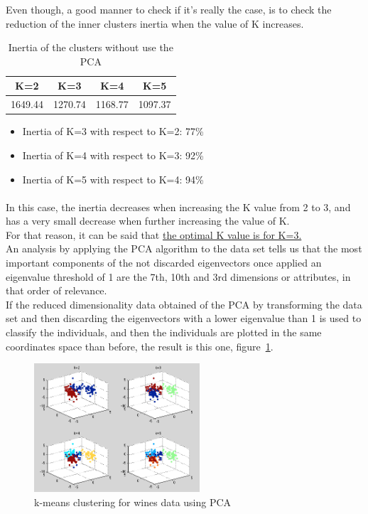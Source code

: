 \documentclass[12pt, a4paper]{article}
\begin{document}
Even though, a good manner to check if it's really the case, is to check the reduction of the inner clusters inertia when the value of K increases.
\begin{table}[ht!]
	\centering
	\begin{tabular}{|c|c|c|c|}
		\hline
		\rowcolor[gray]{0.85} \textbf{K=2}&\textbf{K=3}&\textbf{K=4}&\textbf{K=5}\\\hline
		1649.44&1270.74&1168.77&1097.37\\\hline
	\end{tabular}
	\label{tab:cars}
	\caption{Inertia of the clusters without use the PCA}
\end{table}
\begin{itemize}
	\item Inertia of K=3 with respect to K=2: 77\%
	\item Inertia of K=4 with respect to K=3: 92\%
	\item Inertia of K=5 with respect to K=4: 94\%
\end{itemize}
\paragraph{}In this case, the inertia decreases when increasing the K value from 2 to 3, and has a very small decrease when further increasing the value of K.\\

For that reason, it can be said that \underline{the optimal K value is for K=3.}\\

An analysis by applying the PCA algorithm to the data set tells us that the most important components of the not discarded eigenvectors once applied an eigenvalue threshold of 1 are the 7th, 10th and 3rd dimensions or attributes, in that order of relevance.\\

If the reduced dimensionality data obtained of the PCA by transforming the data set and then discarding the eigenvectors with a lower eigenvalue than 1 is used to classify the individuals, and then the individuals are plotted in the same coordinates space than before, the result is this one, figure~\ref{fig:Wines_2}.
\begin{figure}[ht!]
	\centering
	\includegraphics[width=0.55\textwidth]{img/Wines_2}
	\caption{k-means clustering for wines data using PCA}
	\label{fig:Wines_2}
\end{figure}
\end{document}
